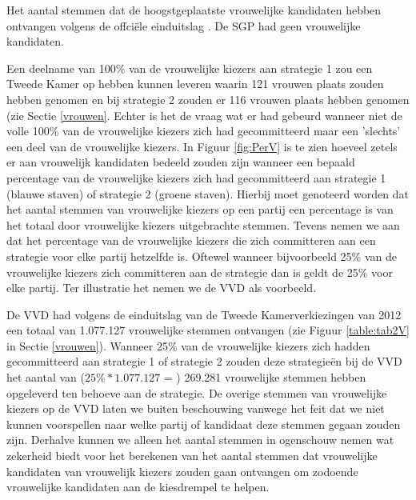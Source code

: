 \begin{table}[H]
\centering
	\begin{footnotesize}
		
	\end{footnotesize}
			\caption{Het aantal stemmen dat de hoogstgeplaatste vrouwelijke kandidaten hebben ontvangen volgens de offci\"{e}le einduitslag \citep{Kiesraad_uitslag}. De SGP had geen vrouwelijke kandidaten.}
\label{table:HoogstV} 
\end{table} 

Een deelname van 100\% van de vrouwelijke kiezers aan strategie 1 zou een Tweede Kamer op hebben kunnen leveren waarin 121 vrouwen plaats zouden hebben genomen en bij strategie 2 zouden er 116 vrouwen plaats hebben genomen (zie Sectie \ref{vrouwen}. Echter is het de vraag wat er had gebeurd wanneer niet de volle 100\% van de vrouwelijke kiezers zich had gecommitteerd maar een 'slechts' een deel van de vrouwelijke kiezers. In Figuur \ref{fig:PerV} is te zien hoeveel zetels er aan vrouwelijk kandidaten bedeeld zouden zijn wanneer een bepaald percentage van de vrouwelijke kiezers zich had gecommitteerd aan strategie 1 (blauwe staven) of strategie 2 (groene staven). Hierbij moet genoteerd worden dat het aantal stemmen van vrouwelijke kiezers op een partij een percentage is van het totaal door vrouwelijke kiezers uitgebrachte stemmen. Tevens nemen we aan dat het percentage van de vrouwelijke kiezers die zich committeren aan een strategie voor elke partij hetzelfde is. Oftewel wanneer bijvoorbeeld 25\% van de vrouwelijke kiezers zich committeren aan de strategie dan is geldt de 25\% voor elke partij. Ter illustratie het nemen we de VVD als voorbeeld.

De VVD had volgens de einduitslag van de Tweede Kamerverkiezingen van 2012 een totaal van 1.077.127 vrouwelijke stemmen ontvangen (zie Figuur \ref{table:tab2V} in Sectie \ref{vrouwen}). Wanneer 25\% van de vrouwelijke kiezers zich hadden gecommitteerd aan strategie 1 of strategie 2 zouden deze strategie\"{e}n bij de VVD het aantal van ($25\%*1.077.127$ = ) 269.281 vrouwelijke stemmen hebben opgeleverd ten behoeve aan de strategie. De overige stemmen van vrouwelijke kiezers op de VVD laten we buiten beschouwing vanwege het feit dat we niet kunnen voorspellen naar welke partij of kandidaat deze stemmen gegaan zouden zijn. Derhalve kunnen we alleen het aantal stemmen in ogenschouw nemen wat zekerheid biedt voor het berekenen van het aantal stemmen dat vrouwelijke kandidaten van vrouwelijk kiezers zouden gaan ontvangen om zodoende vrouwelijke kandidaten aan de kiesdrempel te helpen.  

